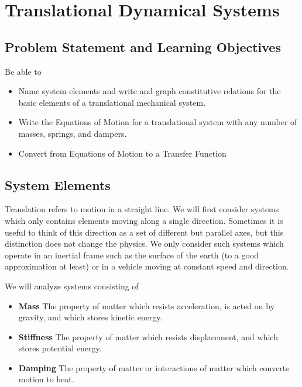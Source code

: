 %
%
%

\chapter{Translational Dynamical Systems}

\section{Problem Statement and Learning Objectives}
Be able to
\begin{itemize}
  \item Name system elements and write and graph constitutive relations for the basic elements
  of a translational mechanical system.
  \item Write the Equations of Motion for a translational system with any number of masses, springs, and dampers. 
  \item Convert from Equations of Motion to a Transfer Function
\end{itemize}

\section{System Elements}

Translation refers to motion in a straight line.   We will first consider systems which only contains elements moving along a single direction.  Sometimes it is useful to think of this direction as a set of different but parallel axes, but this distinction does not change the physics. We only consider such systems which operate in an inertial frame such as the surface of the earth (to a good approximation at least) or in a vehicle moving at constant speed and direction.


We will analyze systems consisting of
\begin{itemize}
  \item {\bf Mass}        The property of matter which resists acceleration, is acted on by gravity, and which stores kinetic energy.
  \item {\bf Stiffness}   The property of matter which resists displacement, and which stores potential energy.
  \item {\bf Damping}     The property of matter or interactions of matter which converts motion to heat.
\end{itemize}


